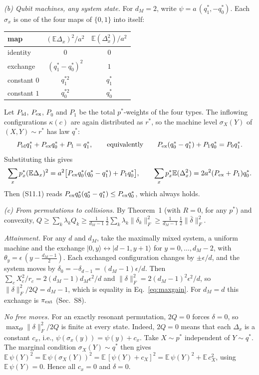 \documentclass[aps,prl,reprint,superscriptaddress,amsmath,amssymb]{revtex4-2}
\begin{document}
\emph{(b) Qubit machines, any system state.} For $d_M=2$, write $\psi=a\,(q^*_1,-q^*_0)$. Each $\sigma_x$ is one of the
four maps of $\{0,1\}$ into itself:
\begin{center}
\begin{tabular}{lcc}
map & $(\mathbb E\Delta_x)^2/a^2$ & $\mathbb E(\Delta_x^2)/a^2$\\ \hline
identity & $0$ & $0$\\
exchange & $(q^*_1-q^*_0)^2$ & $1$\\
constant $0$ & $q_1^{*2}$ & $q^*_1$\\
constant $1$ & $q_0^{*2}$ & $q^*_0$
\end{tabular}
\end{center}
Let $P_{\rm id}$, $P_{\rm ex}$, $P_0$ and $P_1$ be the total $p^*$-weights of the four types. The inflowing
configurations $\kappa(c)$ are again distributed as $r^*$, so the machine level $\sigma_X(Y)$ of $(X,Y)\sim r^*$ has
law $q^*$:
\[
P_{\rm id}q^*_1+P_{\rm ex}q^*_0+P_1=q^*_1,\qquad\text{equivalently}\qquad
P_{\rm ex}(q^*_0-q^*_1)+P_1q^*_0=P_0q^*_1 .
\]
Substituting this gives
\[
\sum_xp^*_x(\mathbb E\Delta_x)^2=a^2\big[P_{\rm ex}q^*_0(q^*_0-q^*_1)+P_1q^*_0\big],\qquad
\sum_xp^*_x\mathbb E(\Delta_x^2)=2a^2(P_{\rm ex}+P_1)q^*_0 .
\]
Then (S11.1) reads $P_{\rm ex}q^*_0(q^*_0-q^*_1)\leq P_{\rm ex}q^*_0$, which always holds.

\emph{(c) From permutations to collisions.} By Theorem~1 (with $R=0$, for any $p^*$) and convexity,
$Q\geq\sum_k\lambda_kQ_k\geq\frac{1}{d_M-1}\,\frac12\sum_k\lambda_k\|\delta_k\|_F^2\geq\frac{1}{d_M-1}\,\frac12\|\bar\delta\|_F^2$.

\emph{Attainment.} For any $d$ and $d_M$, take the maximally mixed system, a uniform machine and the exchange
$|0,y\rangle\leftrightarrow|d-1,y+1\rangle$ for $y=0,\dots,d_M-2$, with $\theta_y=\epsilon\,(y-\frac{d_M-1}{2})$. Each
exchanged configuration changes by $\pm\epsilon/d$, and the system moves by $\delta_0=-\delta_{d-1}=(d_M-1)\epsilon/d$.
Then $\sum_cX_c^2/r_c=2(d_M-1)d_M\epsilon^2/d$ and $\|\delta\|_F^2=2(d_M-1)^2\epsilon^2/d$, so
$\|\delta\|_F^2/2Q=d_M-1$, which is equality in Eq.~\eqref{eq:maxgain}. For $d_M=d$ this exchange is $\pi_{\rm ext}$
(Sec.~S8).

\emph{No free moves.} For an exactly resonant permutation, $2Q=0$ forces $\delta=0$, so $\max_\Theta\|\delta\|_F^2/2Q$
is finite at every state. Indeed, $2Q=0$ means that each $\Delta_x$ is a constant $c_x$, i.e.,
$\psi(\sigma_x(y))=\psi(y)+c_x$. Take $X\sim p^*$ independent of $Y\sim q^*$. The marginal condition
$\sigma_X(Y)\sim q^*$ then gives
$\mathbb E\,\psi(Y)^2=\mathbb E\,\psi(\sigma_X(Y))^2=\mathbb E\,[\psi(Y)+c_X]^2=\mathbb E\,\psi(Y)^2+\mathbb E\,c_X^2$,
using $\mathbb E\,\psi(Y)=0$. Hence all $c_x=0$ and $\delta=0$.
\end{document}
